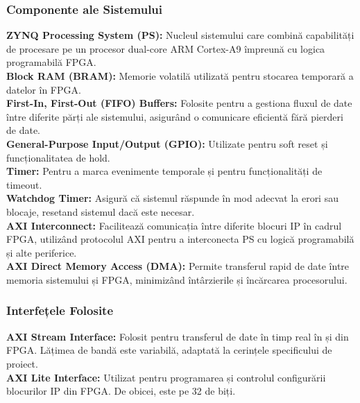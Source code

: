 \documentclass[12pt]{article}
\begin{document}
\subsubsection{Componente ale Sistemului}
\textbf{ZYNQ Processing System (PS):} Nucleul sistemului care combină capabilități de procesare pe un procesor dual-core ARM Cortex-A9 împreună cu logica programabilă FPGA.\\
\textbf{Block RAM (BRAM):} Memorie volatilă utilizată pentru stocarea temporară a datelor în FPGA.\\
\textbf{First-In, First-Out (FIFO) Buffers:} Folosite pentru a gestiona fluxul de date între diferite părți ale sistemului, asigurând o comunicare eficientă fără pierderi de date.\\
\textbf{General-Purpose Input/Output (GPIO):} Utilizate pentru soft reset și funcționalitatea de hold.\\
\textbf{Timer:} Pentru a marca evenimente temporale și pentru funcționalități de timeout.\\
\textbf{Watchdog Timer:} Asigură că sistemul răspunde în mod adecvat la erori sau blocaje, resetand sistemul dacă este necesar.\\
\textbf{AXI Interconnect:} Facilitează comunicația între diferite blocuri IP în cadrul FPGA, utilizând protocolul AXI pentru a interconecta PS cu logică programabilă și alte periferice.\\
\textbf{AXI Direct Memory Access (DMA):} Permite transferul rapid de date între memoria sistemului și FPGA, minimizând întârzierile și încărcarea procesorului.\\

\subsubsection{Interfețele Folosite}
\textbf{AXI Stream Interface:} Folosit pentru transferul de date în timp real în și din FPGA. Lățimea de bandă este variabilă, adaptată la cerințele specificului de proiect.\\
\textbf{AXI Lite Interface:} Utilizat pentru programarea și controlul configurării blocurilor IP din FPGA. De obicei, este pe 32 de biți.\\
\end{document}
